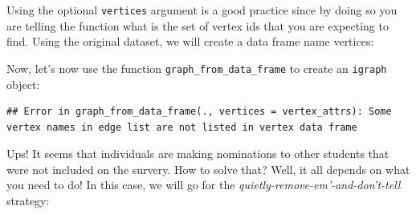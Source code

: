 \documentclass[]{book}
\newenvironment{Shaded}{\begin{snugshade}}{\end{snugshade}}
\newcommand{\KeywordTok}[1]{\textcolor[rgb]{0.13,0.29,0.53}{\textbf{#1}}}
\newcommand{\DataTypeTok}[1]{\textcolor[rgb]{0.13,0.29,0.53}{#1}}
\newcommand{\StringTok}[1]{\textcolor[rgb]{0.31,0.60,0.02}{#1}}
\newcommand{\CommentTok}[1]{\textcolor[rgb]{0.56,0.35,0.01}{\textit{#1}}}
\newcommand{\OperatorTok}[1]{\textcolor[rgb]{0.81,0.36,0.00}{\textbf{#1}}}
\newcommand{\NormalTok}[1]{#1}
\theoremstyle{definition}
\theoremstyle{definition}
\theoremstyle{definition}
\theoremstyle{remark}
\begin{document}
Using the optional \texttt{vertices} argument is a good practice since
by doing so you are telling the function what is the set of vertex ids
that you are expecting to find. Using the original dataset, we will
create a data frame name vertices:

\begin{Shaded}
\end{Shaded}

Now, let's now use the function \texttt{graph\_from\_data\_frame} to
create an \texttt{igraph} object:

\begin{Shaded}
\end{Shaded}

\begin{verbatim}
## Error in graph_from_data_frame(., vertices = vertex_attrs): Some vertex names in edge list are not listed in vertex data frame
\end{verbatim}

Ups! It seems that individuals are making nominations to other students
that were not included on the survery. How to solve that? Well, it all
depends on what you need to do! In this case, we will go for the
\emph{quietly-remove-em'-and-don't-tell} strategy:

\begin{Shaded}
\end{Shaded}
\end{document}
